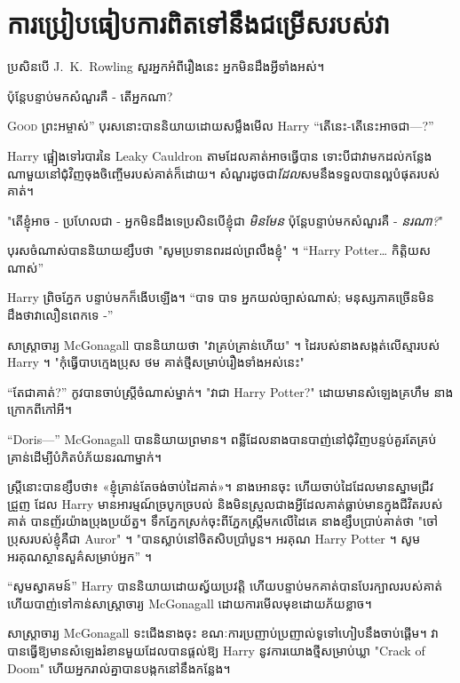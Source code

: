 \chapter{ការប្រៀបធៀបការពិតទៅនឹងជម្រើសរបស់វា}

\begin{chapterOpeningAuthorNote}
ប្រសិនបើ J.~K.~Rowling សួរអ្នកអំពីរឿងនេះ អ្នកមិនដឹងអ្វីទាំងអស់។
\end{chapterOpeningAuthorNote}
\begin{chapterOpeningQuote}
ប៉ុន្តែបន្ទាប់មកសំណួរគឺ - តើអ្នកណា?
\end{chapterOpeningQuote}

\lettrine[ante=“]{G}{ood} ព្រះអម្ចាស់” បុរសនោះបាននិយាយដោយសម្លឹងមើល Harry “តើនេះ-តើនេះអាចជា—?”

Harry ផ្អៀងទៅរបារនៃ Leaky Cauldron តាមដែលគាត់អាចធ្វើបាន ទោះបីជាវាមកដល់កន្លែងណាមួយនៅជុំវិញចុងចិញ្ចើមរបស់គាត់ក៏ដោយ។ សំណួរដូចជា\emph{ដែល}សមនឹងទទួលបានល្អបំផុតរបស់គាត់។

"តើខ្ញុំអាច - ប្រហែលជា - អ្នកមិនដឹងទេប្រសិនបើខ្ញុំជា \emph{មិនមែន} ប៉ុន្តែបន្ទាប់មកសំណួរគឺ - \emph{នរណា?}"

បុរសចំណាស់បាននិយាយខ្សឹបថា "សូមប្រទានពរដល់ព្រលឹងខ្ញុំ" ។ “Harry Potter… កិត្តិយសណាស់”

Harry ព្រិចភ្នែក បន្ទាប់មកក៏ងើបឡើង។ “បាទ បាទ អ្នកយល់ច្បាស់ណាស់; មនុស្សភាគច្រើនមិនដឹងថាវាលឿនពេកទេ -”

សាស្រ្តាចារ្យ McGonagall បាននិយាយថា "វាគ្រប់គ្រាន់ហើយ" ។ ដៃរបស់នាងសង្កត់លើស្មារបស់ Harry ។ "កុំធ្វើបាបក្មេងប្រុស ថម គាត់ថ្មីសម្រាប់រឿងទាំងអស់នេះ"

“តែជាគាត់?” កូវបានចាប់ស្ត្រីចំណាស់ម្នាក់។ "វាជា Harry Potter?" ដោយ​មាន​សំឡេង​គ្រហឹម នាង​ក្រោក​ពី​កៅអី។

“Doris—” McGonagall បាននិយាយព្រមាន។ ពន្លឺដែលនាងបានបាញ់នៅជុំវិញបន្ទប់គួរតែគ្រប់គ្រាន់ដើម្បីបំភិតបំភ័យនរណាម្នាក់។

ស្ត្រី​នោះ​បាន​ខ្សឹប​ថា៖ «ខ្ញុំ​គ្រាន់​តែ​ចង់​ចាប់​ដៃ​គាត់»។ នាង​អោន​ចុះ ហើយ​ចាប់​ដៃ​ដែល​មាន​ស្នាម​ជ្រីវជ្រួញ ដែល Harry មានអារម្មណ៍​ច្របូកច្របល់ និង​មិន​ស្រួល​ជាង​អ្វី​ដែល​គាត់​ធ្លាប់​មាន​ក្នុង​ជីវិត​របស់​គាត់ បាន​ញ័រ​យ៉ាង​ប្រុង​ប្រយ័ត្ន។ ទឹកភ្នែក​ស្រក់​ចុះ​ពី​ភ្នែក​ស្ត្រី​មក​លើ​ដៃ​គេ នាងខ្សឹបប្រាប់គាត់ថា "ចៅប្រុសរបស់ខ្ញុំគឺជា Auror" ។ "បានស្លាប់នៅចិតសិបប្រាំបួន។ អរគុណ Harry Potter ។ សូមអរគុណស្ថានសួគ៌សម្រាប់អ្នក” ។

“សូមស្វាគមន៍” Harry បាននិយាយដោយស្វ័យប្រវត្តិ ហើយបន្ទាប់មកគាត់បានបែរក្បាលរបស់គាត់ ហើយបាញ់ទៅកាន់សាស្រ្តាចារ្យ McGonagall ដោយការមើលមុខដោយភ័យខ្លាច។

សាស្ត្រាចារ្យ McGonagall ទះ​ជើង​នាង​ចុះ ខណៈ​ការ​ប្រញាប់ប្រញាល់​ទូទៅ​ហៀបនឹង​ចាប់ផ្តើម។ វា​បាន​ធ្វើ​ឱ្យ​មាន​សំឡេង​រំខាន​មួយ​ដែល​បាន​ផ្តល់​ឱ្យ Harry នូវ​ការ​យោង​ថ្មី​សម្រាប់​ឃ្លា "Crack of Doom" ហើយ​អ្នក​រាល់​គ្នា​បាន​បង្កក​នៅ​នឹង​កន្លែង។

